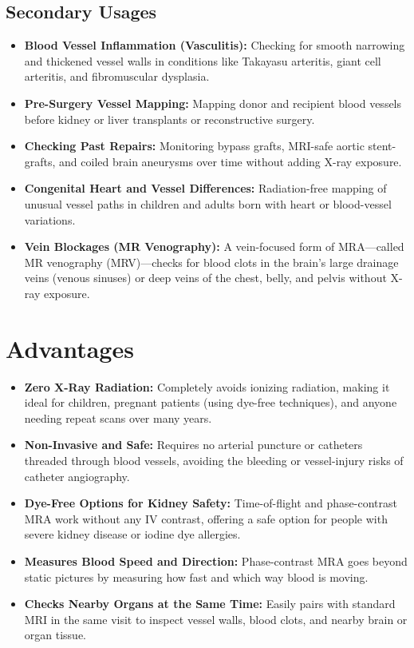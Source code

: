 \subsection{Secondary Usages}
\begin{itemize}
\item \textbf{Blood Vessel Inflammation (Vasculitis):} Checking for smooth narrowing and thickened vessel walls in conditions like Takayasu arteritis, giant cell arteritis, and fibromuscular dysplasia.
\item \textbf{Pre-Surgery Vessel Mapping:} Mapping donor and recipient blood vessels before kidney or liver transplants or reconstructive surgery.
\item \textbf{Checking Past Repairs:} Monitoring bypass grafts, MRI-safe aortic stent-grafts, and coiled brain aneurysms over time without adding X-ray exposure.
\item \textbf{Congenital Heart and Vessel Differences:} Radiation-free mapping of unusual vessel paths in children and adults born with heart or blood-vessel variations.
\item \textbf{Vein Blockages (MR Venography):} A vein-focused form of MRA---called MR venography (MRV)---checks for blood clots in the brain's large drainage veins (venous sinuses) or deep veins of the chest, belly, and pelvis without X-ray exposure.
\end{itemize}

\section{Advantages}
\begin{itemize}
\item \textbf{Zero X-Ray Radiation:} Completely avoids ionizing radiation, making it ideal for children, pregnant patients (using dye-free techniques), and anyone needing repeat scans over many years.
\item \textbf{Non-Invasive and Safe:} Requires no arterial puncture or catheters threaded through blood vessels, avoiding the bleeding or vessel-injury risks of catheter angiography.
\item \textbf{Dye-Free Options for Kidney Safety:} Time-of-flight and phase-contrast MRA work without any IV contrast, offering a safe option for people with severe kidney disease or iodine dye allergies.
\item \textbf{Measures Blood Speed and Direction:} Phase-contrast MRA goes beyond static pictures by measuring how fast and which way blood is moving.
\item \textbf{Checks Nearby Organs at the Same Time:} Easily pairs with standard MRI in the same visit to inspect vessel walls, blood clots, and nearby brain or organ tissue.
\end{itemize}


